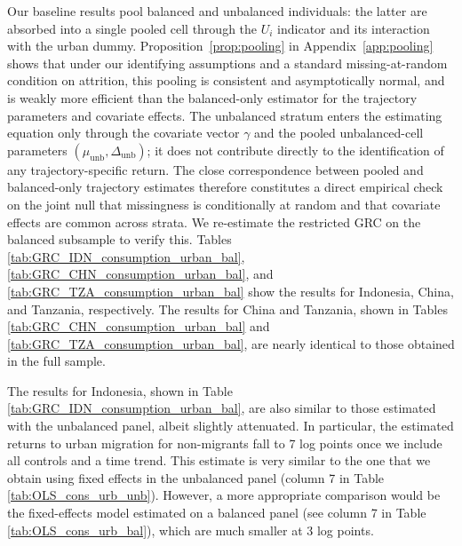\documentclass[12pt]{article}
\begin{document}


Our baseline results pool balanced and unbalanced individuals: the latter are absorbed into a single pooled cell through the $U_i$ indicator and its interaction with the urban dummy.
Proposition~\ref{prop:pooling} in Appendix~\ref{app:pooling} shows that under our identifying assumptions and a standard missing-at-random condition on attrition, this pooling is consistent and asymptotically normal, and is weakly more efficient than the balanced-only estimator for the trajectory parameters and covariate effects.
The unbalanced stratum enters the estimating equation only through the covariate vector $\gamma$ and the pooled unbalanced-cell parameters $(\mu_{\mathrm{unb}},\Delta_{\mathrm{unb}})$; it does not contribute directly to the identification of any trajectory-specific return.
The close correspondence between pooled and balanced-only trajectory estimates therefore constitutes a direct empirical check on the joint null that missingness is conditionally at random and that covariate effects are common across strata.
We re-estimate the restricted GRC on the balanced subsample to verify this.
Tables \ref{tab:GRC_IDN_consumption_urban_bal}, \ref{tab:GRC_CHN_consumption_urban_bal}, and \ref{tab:GRC_TZA_consumption_urban_bal}  show the results for Indonesia, China, and Tanzania, respectively.
The results for China and Tanzania, shown in Tables \ref{tab:GRC_CHN_consumption_urban_bal} and \ref{tab:GRC_TZA_consumption_urban_bal}, are nearly identical to those obtained in the full sample.

 
 
 

The results for Indonesia, shown in Table \ref{tab:GRC_IDN_consumption_urban_bal}, are also similar to those estimated with the unbalanced panel, albeit slightly attenuated. 
In particular, the estimated returns to urban migration for non-migrants fall to 7 log points once we include all controls and a time trend. 
This estimate is very similar to the one that we obtain using fixed effects in the unbalanced panel (column 7 in Table \ref{tab:OLS_cons_urb_unb}). 
However, a more appropriate comparison would be the fixed-effects model estimated on a balanced panel (see column 7 in Table \ref{tab:OLS_cons_urb_bal}), which are much smaller at 3 log points. 
\end{document}

